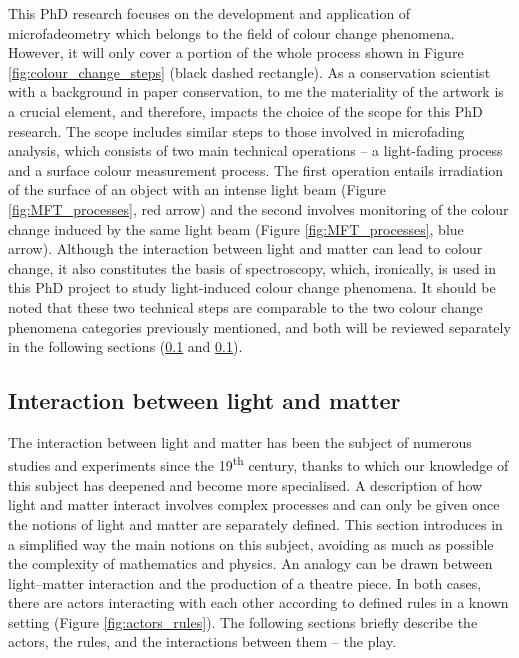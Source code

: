 This PhD research focuses on the development and application of microfadeometry which belongs to the field of colour change phenomena. However, it will only cover a portion of the whole process shown in Figure \ref{fig:colour_change_steps} (black dashed rectangle). As a conservation scientist with a background in paper conservation, to me the materiality of the artwork is a crucial element, and therefore, impacts the choice of the scope for this PhD research. The scope includes similar steps to those involved in microfading analysis, which consists of two main technical operations – a light-fading process and a surface colour measurement process. The first operation entails irradiation of the surface of an object with an intense light beam (Figure \ref{fig:MFT_processes}, red arrow) and the second involves monitoring of the colour change induced by the same light beam (Figure \ref{fig:MFT_processes}, blue arrow). Although the interaction between light and matter can lead to colour change, it also constitutes the basis of spectroscopy, which, ironically, is used in this PhD project to study light-induced colour change phenomena. It should be noted that these two technical steps are comparable to the two colour change phenomena categories previously mentioned, and both will be reviewed separately in the following sections (\ref{sec:interaction_light-matter} and \ref{sec:interaction_light-matter}).\\



\subsection{Interaction between light and matter}
\label{sec:interaction_light-matter}

The interaction between light and matter has been the subject of numerous studies and experiments since the 19\textsuperscript{th} century, thanks to which our knowledge of this subject has deepened and become more specialised. A description of how light and matter interact involves complex processes and can only be given once the notions of light and matter are separately defined. This section introduces in a simplified way the main notions on this subject, avoiding as much as possible the complexity of mathematics and physics. An analogy can be drawn between light–matter interaction and the production of a theatre piece. In both cases, there are actors interacting with each other according to defined rules in a known setting (Figure \ref{fig:actors_rules}). The following sections briefly describe the actors, the rules, and the interactions between them – the play.\\

